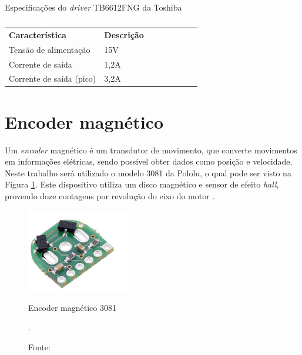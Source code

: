 \begin{table}[h!]
\centering
 \captionsetup{width=0.5\textwidth,font=footnotesize,textfont=bf}
\caption{Especificações do \textit{driver} TB6612FNG da Toshiba \label{tab:ponteh}}
\begin{tabular}{llllllll}
\cline{1-2}
\bf Característica & \bf Descrição & & &  \\ \cline{1-2}
Tensão de alimentação & 15V & & &  \\
Corrente de saída & 1,2A  & & &  \\
Corrente de saída (pico) & 3,2A & & &  \\ \cline{1-2}
\end{tabular}
\caption*{\cite{pololu_motor} }
\end{table}


\vspace{0.5cm}
\section{Encoder magnético} \label{cap:encoder}

Um \textit{encoder} magnético é um transdutor de movimento, que converte movimentos em informações elétricas, %
sendo possível obter dados como posição e velocidade. Neste trabalho será utilizado o modelo 3081 da 
Pololu, %
o qual pode ser visto na Figura \ref{fig:encoder}. Este dispositivo utiliza um disco 
magnético e sensor de efeito \textit{hall}, provendo doze contagens por revolução do eixo do motor \cite{pololu_encoder}. 

\begin{figure}[h!]
 \centering
 \captionsetup{width=0.4\textwidth,font=footnotesize,textfont=bf}
 \includegraphics[width=0.4\textwidth,height=0.8\textheight,keepaspectratio]{figuras/encoder.png}
 \caption{Encoder magnético 3081 \label{fig:encoder}}
 \vspace{-0.3cm}
 \caption*{Fonte: \cite{pololu_encoder}}.
\end{figure}


